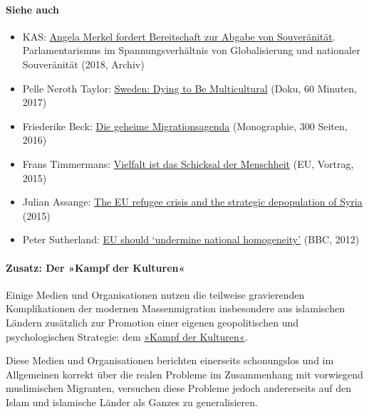\hypertarget{siehe-auch}{%
\paragraph{Siehe auch}\label{siehe-auch}}

\begin{itemize}
\tightlist
\item
  KAS:
  \href{https://web.archive.org/web/20181123235853/https://www.kas.de/veranstaltungsberichte/detail/-/content/-das-herz-der-demokratie-}{Angela
  Merkel fordert Bereitschaft zur Abgabe von Souveränität}.
  Parlamentarismus im Spannungsverhältnis von Globalisierung und
  nationaler Souveränität (2018, Archiv)
\item
  Pelle Neroth Taylor:
  \href{https://www.bitchute.com/video/BmjhwEPedFzI/}{Sweden: Dying to
  Be Multicultural} (Doku, 60 Minuten, 2017)
\item
  Friederike Beck:
  \href{https://www.amazon.de/Die-geheime-Migrationsagenda-superreichen-Stiftungen-ebook/dp/B01KN7SHMC}{Die
  geheime Migrationsagenda} (Monographie, 300 Seiten, 2016)
\item
  Frans Timmermans:
  \href{https://www.youtube.com/watch?v=dIE9Ztn56Ig}{Vielfalt ist das
  Schicksal der Menschheit} (EU, Vortrag, 2015)
\item
  Julian Assange: \href{https://www.youtube.com/watch?v=sMwMboGWBSg}{The
  EU refugee crisis and the strategic depopulation of Syria} (2015)
\item
  Peter Sutherland:
  \href{https://www.bbc.com/news/uk-politics-18519395}{EU should
  `undermine national homogeneity'} (BBC, 2012)
\end{itemize}

\hypertarget{zusatz-der-kampf-der-kulturen}{%
\paragraph{Zusatz: Der »Kampf der
Kulturen«}\label{zusatz-der-kampf-der-kulturen}}

Einige Medien und Organisationen nutzen die teilweise gravierenden
Komplikationen der modernen Massen­migration insbesondere aus
islamischen Län­dern zusätzlich zur Promotion einer eigenen
geo­po­li­tischen und psychologischen Strategie: dem
\href{https://de.wikipedia.org/wiki/Kampf_der_Kulturen}{»Kampf der
Kulturen«}.

Diese Medien und Organisationen berichten einerseits schonungslos und im
Allgemeinen korrekt über die realen Probleme im Zusammenhang mit
vorwiegend muslimischen Migranten, versuchen diese Probleme jedoch
ande­rer­seits auf den Islam und islamische Länder als Ganzes zu
generalisieren.

